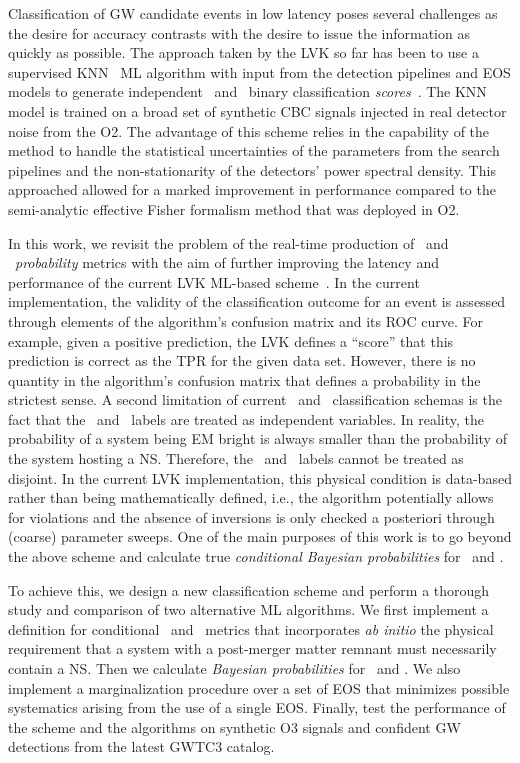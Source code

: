 Classification of \ac{GW} candidate events in low latency poses several challenges as the desire for accuracy contrasts with the desire to issue the information as quickly as possible. The
approach taken by the \ac{LVK} so far has been to use a supervised \ac{KNN}~\cite{Pedregosa:2011ork} \ac{ML} algorithm with input from the detection pipelines and \ac{EOS} models to generate
independent \hasns\ and \hasrem\ binary classification \emph{scores}~\cite{Chatterjee:2019avs}. The \ac{KNN} model is trained on a broad set of synthetic \ac{CBC} signals injected in real
detector noise from the \ac{O2}. The advantage of this scheme relies in the capability of the method to handle the statistical uncertainties of the parameters from the search pipelines and the
non-stationarity of the detectors' power spectral density. This approached allowed for a marked improvement in performance compared to the semi-analytic effective Fisher formalism method that
was deployed in \ac{O2}.

In this work, we revisit the problem of the real-time production of \hasns\ and \hasrem\ \emph{probability} metrics with the aim of further improving the latency and performance of the current
\ac{LVK} \ac{ML}-based scheme~\cite{Chatterjee:2019avs}. In the current implementation, the validity of the classification outcome for an event is assessed through elements of the algorithm's
confusion matrix and its \ac{ROC} curve. For example, given a positive prediction, the \ac{LVK} defines a ``score'' that this prediction is correct as the \ac{TPR} for the given data
set. However, there is no quantity in the algorithm's confusion matrix that defines a probability in the strictest sense. A second limitation of current \hasns\ and \hasrem\ classification
schemas is the fact that the \hasns\ and \hasrem\ labels are treated as independent variables. In reality, the probability of a system being \ac{EM} bright is always smaller than the probability
of the system hosting a \ac{NS}. Therefore, the \hasns\ and \hasrem\ labels cannot be treated as disjoint. In the current \ac{LVK} implementation, this physical condition is data-based rather
than being mathematically defined, i.e., the algorithm potentially allows for violations and the absence of inversions is only checked a posteriori through (coarse) parameter sweeps. One of the
main purposes of this work is to go beyond the above scheme and calculate true \emph{conditional Bayesian probabilities} for \hasns\ and \hasrem. 

To achieve this, we design a new classification scheme and perform a thorough study and comparison of two alternative \ac{ML} algorithms. We first implement a definition for conditional \hasns\
and \hasrem\ metrics that incorporates \emph{ab initio} the physical requirement that a system with a post-merger matter remnant must necessarily contain a \ac{NS}. Then we calculate
\emph{Bayesian probabilities} for \hasns\ and \hasrem. We also implement a marginalization procedure over a set of \ac{EOS} that minimizes possible systematics arising from the use of a single
\ac{EOS}. Finally, test the performance of the scheme and the algorithms on synthetic \ac{O3} signals and confident \ac{GW} detections from the latest \ac{GWTC3} catalog.

